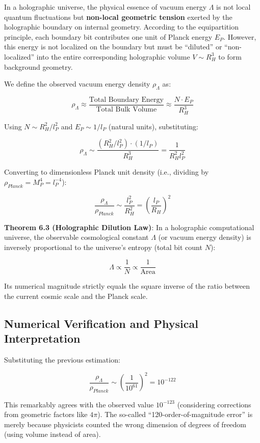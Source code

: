 In a holographic universe, the physical essence of vacuum energy $\Lambda$ is not local quantum fluctuations but \textbf{non-local geometric tension} exerted by the holographic boundary on internal geometry.
According to the equipartition principle, each boundary bit contributes one unit of Planck energy $E_P$. However, this energy is not localized on the boundary but must be ``diluted'' or ``non-localized'' into the entire corresponding holographic volume $V \sim R_H^3$ to form background geometry.

We define the observed vacuum energy density $\rho_{\Lambda}$ as:

\[\rho_{\Lambda} \approx \frac{\text{Total Boundary Energy}}{\text{Total Bulk Volume}} \approx \frac{N \cdot E_P}{R_H^3}\]

Using $N \sim R_H^2/l_P^2$ and $E_P \sim 1/l_P$ (natural units), substituting:

\[\rho_{\Lambda} \sim \frac{(R_H^2/l_P^2) \cdot (1/l_P)}{R_H^3} = \frac{1}{R_H^2 l_P^2}\]

Converting to dimensionless Planck unit density (i.e., dividing by $\rho_{Planck} = M_P^4 = l_P^{-4}$):

\[\frac{\rho_{\Lambda}}{\rho_{Planck}} \sim \frac{l_P^2}{R_H^2} = \left( \frac{l_P}{R_H} \right)^2\]

\textbf{Theorem 6.3 (Holographic Dilution Law)}:
In a holographic computational universe, the observable cosmological constant $\Lambda$ (or vacuum energy density) is inversely proportional to the universe's entropy (total bit count $N$):

\[\Lambda \propto \frac{1}{N} \propto \frac{1}{\text{Area}}\]

Its numerical magnitude strictly equals the square inverse of the ratio between the current cosmic scale and the Planck scale.

\subsection{Numerical Verification and Physical Interpretation}

Substituting the previous estimation:

\[\frac{\rho_{\Lambda}}{\rho_{Planck}} \sim \left( \frac{1}{10^{61}} \right)^2 = 10^{-122}\]

This remarkably agrees with the observed value $10^{-123}$ (considering corrections from geometric factors like $4\pi$). The so-called ``120-order-of-magnitude error'' is merely because physicists counted the wrong dimension of degrees of freedom (using volume instead of area).

